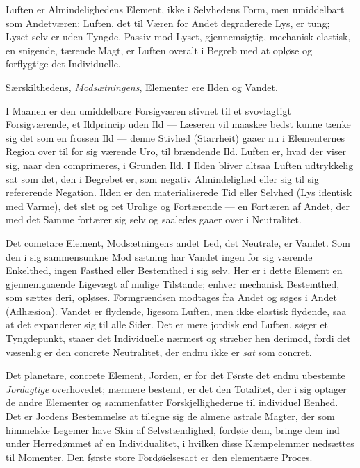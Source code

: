 \documentclass[12pt,a4paper]{book}
\begin{document}
Luften er Almindelighedens Element, ikke i Selvhedens Form, men
umiddelbart som Andetværen; Luften, det til Væren for Andet
degraderede Lys, er tung; Lyset selv er uden Tyngde. Passiv mod
Lyset, gjennemsigtig, mechanisk elastisk, en snigende, tærende Magt,
er Luften overalt i Begreb med at opløse og forflygtige det
Individuelle.

Særskilthedens, \emph{Modsætningens}, Elementer ere Ilden og Vandet.

I Maanen er den umiddelbare Forsigværen stivnet til et svovlagtigt
Forsigværende, et Ildprincip uden Ild --- Læseren vil maaskee bedst
kunne tænke sig det som en frossen Ild --- denne Stivhed (Starrheit)
gaaer nu i Elementernes Region over til for sig værende Uro, til
brændende Ild. Luften er, hvad der viser sig, naar den comprimeres, i
Grunden Ild. I Ilden bliver altsaa Luften udtrykkelig sat som det, den
i Begrebet er, som negativ Almindelighed eller sig til sig refererende
Negation. Ilden er den materialiserede Tid eller Selvhed (Lys identisk
med Varme), det slet og ret Urolige og Fortærende --- en Fortæren af
Andet, der med det Samme fortærer sig selv og saaledes gaaer over i
Neutralitet.

Det cometare Element, Modsætningens andet Led, det Neutrale, er
Vandet. Som den i sig sammensunkne Mod\-%
sætning har Vandet ingen for sig værende Enkelthed, ingen Fasthed
eller Bestemthed i sig selv. Her er i dette Element en gjennemgaaende
Ligevægt af mulige Tilstande; enhver mechanisk Bestemthed, som sættes
deri, opløses. Formgrændsen modtages fra Andet og søges i Andet
(Adhæsion). Vandet er flydende, ligesom Luften, men ikke elastisk
flydende, saa at det expanderer sig til alle Sider. Det er mere
jordisk end Luften, søger et Tyngdepunkt, staaer det Individuelle
nærmest og stræber hen derimod, fordi det væsenlig er den concrete
Neutralitet, der endnu ikke er
\emph{sat} som concret.

Det planetare, concrete Element, Jorden, er for det Første det endnu
ubestemte \emph{Jordagtige} overhovedet; nærmere bestemt, er det den
Totalitet, der i sig optager de andre Elementer og sammenfatter
Forskjellighederne til individuel Eenhed. Det er Jordens Bestemmelse
at tilegne sig de almene astrale Magter, der som himmelske Legemer
have Skin af Selvstændighed, fordøie dem, bringe dem ind under
Herredømmet af en Individualitet, i hvilken disse Kæmpelemmer
nedsættes til Momenter. Den første store Fordøielsesact er den
elementære Proces.
\end{document}
